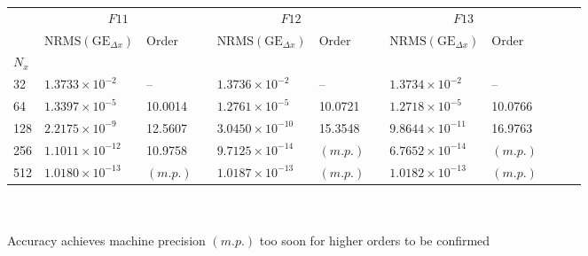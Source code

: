 \documentclass{beamer}
\begin{document}
\begin{frame}

\newcommand\Fontvi{\fontsize{7}{7.2}\selectfont}
\Fontvi
\renewcommand\arraystretch{2} 
\hspace*{-6.5mm}\begin{tabular}{@{}lllcllcllcll@{}}\toprule[2 pt]
&\multicolumn{2}{c}{$F11$} & \phantom{a} & \multicolumn{2}{c}{$F12$} &
\phantom{a} & \multicolumn{2}{c}{$F13$}  \\
\cmidrule{2-3} \cmidrule{5-6} \cmidrule{8-9} 
& $\text{NRMS}(\text{GE}_{\Delta x})$ & Order && $\text{NRMS}(\text{GE}_{\Delta x})$ & Order && $\text{NRMS}(\text{GE}_{\Delta x})$ & Order   \\
\midrule
\phantom{a}$N_x$ \\

\phantom{a}32	& $1.3733\times 10^{-2}$	&	--		        &&	$1.3736\times 10^{-2}$	&	--		&&	$1.3734\times 10^{-2}$	&	--	\\
\phantom{a}64	& $1.3397\times 10^{-5}$	&	10.0014		        &&	$1.2761\times 10^{-5}$	&	10.0721		&&	$1.2718\times 10^{-5}$	&	10.0766	\\
\phantom{a}128	& $2.2175\times 10^{-9}$	&	12.5607		        &&	$3.0450\times 10^{-10}$	&	15.3548		&&	$9.8644\times 10^{-11}$	&	16.9763	\\
\phantom{a}256	& $1.1011\times 10^{-12}$	&	10.9758&&	$9.7125\times 10^{-14}$	&	$(m.p.)$		&&	$6.7652\times 10^{-14}$	&	$(m.p.)$	\\
\phantom{a}512	& $1.0180\times 10^{-13}$	&	$(m.p.)$		&&	$1.0187\times 10^{-13}$	&	$(m.p.)$		&&	$1.0182\times 10^{-13}$	&	$(m.p.)$	\\

\bottomrule[2 pt]
\end{tabular}
${}$\\${}$\\
Accuracy achieves machine precision $(m.p.)$ too soon for higher orders to be confirmed
\end{frame}



\end{document}
